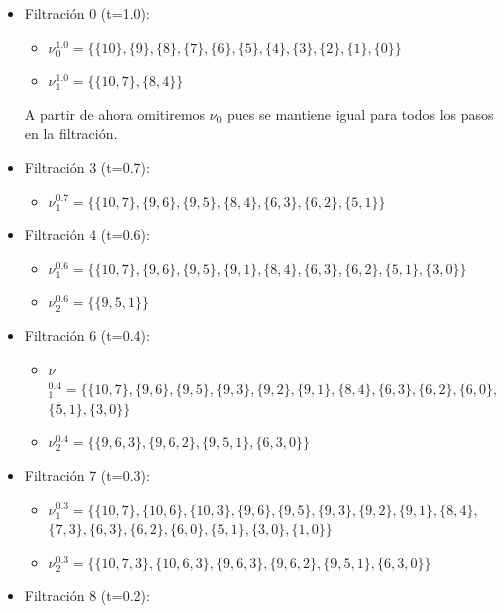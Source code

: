 \documentclass[12pt, a4paper, twoside]{book}
\numberwithin{equation}{section}
\theoremstyle{definition}
\newenvironment{ejem}
  {\pushQED{\qed}\renewcommand{\qedsymbol}{$\blacktriangleleft$}\ejemplo}
  {\popQED\endejemplo}
\theoremstyle{remark}
\theoremstyle{plain}
\begin{document}
\begin{ejem}
\begin{itemize}
			\item Filtración 0 (t=1.0):
				\begin{itemize}
					\item {\Large $\nu$}$^{1.0}_{0}=\{\{10\},\{9\},\{8\},\{7\},\{6\},\{5\},\{4\},\{3\},\{2\},\{1\},\{0\}\}$
					\item {\Large $\nu$}$^{1.0}_{1}=\{\{10, 7\},\{8, 4\}\}$
				\end{itemize}
				A partir de ahora omitiremos 
				{\Large $\nu$}$_{0}$ pues se mantiene igual 
				para todos los pasos en la filtración.
			\item Filtración 3 (t=0.7):
				\begin{itemize}
					\item {\Large $\nu$}$^{0.7}_{1}=\{\{10, 7\},\{9, 6\},\{9, 5\},\{8, 4\},\{6, 3\},\{6, 2\},\{5, 1\}\}$
				\end{itemize}
			\item Filtración 4 (t=0.6):
				\begin{itemize}
					\item {\Large $\nu$}$^{0.6}_{1}=\{\{10, 7\},\{9, 6\},\{9, 5\},\{9, 1\},\{8, 4\},\{6, 3\},\{6, 2\},\{5, 1\},\{3, 0\}\}$
					\item {\Large $\nu$}$^{0.6}_{2}=\{\{9, 5, 1\}\}$
				\end{itemize}
			\item Filtración 6 (t=0.4):
				\begin{itemize}
					\item {\Large $\nu$}$^{0.4}_{1}=\{\{10, 7\},\{9, 6\},\{9, 5\},\{9, 3\},\{9, 2\},\{9, 1\},\{8, 4\},\{6, 3\},\{6, 2\},
						\{6, 0\},$ \\$\{5, 1\},\{3, 0\}\}$
					\item {\Large $\nu$}$^{0.4}_{2}=\{\{9, 6, 3\},\{9, 6, 2\},\{9, 5, 1\},\{6, 3, 0\}\}$
				\end{itemize}
			\item Filtración 7 (t=0.3):
				\begin{itemize}
					\item {\Large $\nu$}$^{0.3}_{1}=\{\{10, 7\},\{10, 6\},\{10, 3\},\{9, 6\},\{9, 5\},\{9, 3\},\{9, 2\},\{9, 1\},\{8, 4\},$\\ 
							$\{7, 3\},\{6, 3\},\{6, 2\},\{6, 0\},\{5, 1\},\{3, 0\},\{1, 0\}\}$
					\item {\Large $\nu$}$^{0.3}_{2}=\{\{10, 7, 3\},\{10, 6, 3\},\{9, 6, 3\},\{9, 6, 2\},\{9, 5, 1\},\{6, 3, 0\}\}$
				\end{itemize}
			\item Filtración 8 (t=0.2):

\end{itemize}
\end{ejem}
\end{document}
